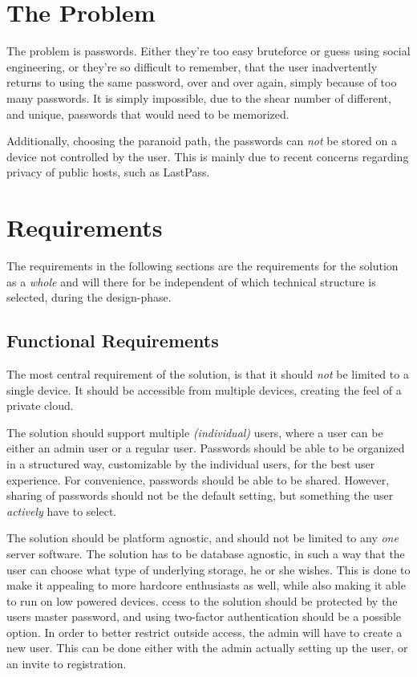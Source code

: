 	\section{The Problem}
		The problem is passwords. Either they're too easy bruteforce or guess using social engineering, or they're so difficult to remember, that the user inadvertently returns to using the same password, over and over again, simply because of too many passwords. It is simply impossible, due to the shear number of different, and unique, passwords that would need to be memorized.

		Additionally, choosing the paranoid path, the passwords can \emph{not} be stored on a device not controlled by the user. This is mainly due to recent concerns regarding privacy of public hosts, such as LastPass.





	\section{Requirements}
		The requirements in the following sections are the requirements for the solution as a \emph{whole} and will there for be independent of which technical structure is selected, during the design-phase.



		\subsection*{Functional Requirements}
			The most central requirement of the solution, is that it should \emph{not} be limited to a single device. It should be accessible from multiple devices, creating the feel of a private cloud. 

			The solution should support multiple \emph{(individual)} users, where a user can be either an admin user or a regular user. Passwords should be able to be organized in a structured way, customizable by the individual users, for the best user experience. For convenience, passwords should be able to be shared. However, sharing of passwords should not be the default setting, but something the user \emph{actively} have to select.

			The solution should be platform agnostic, and should not be limited to any \emph{one} server software. The solution has to be database agnostic, in such a way that the user can choose what type of underlying storage, he or she wishes. This is done to make it appealing to more hardcore enthusiasts as well, while also making it able to run on low powered devices. ccess to the solution should be protected by the users master password, and using two-factor authentication should be a possible option. In order to better restrict outside access, the admin will have to create a new user. This can be done either with the admin actually setting up the user, or an invite to registration.

